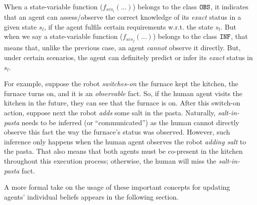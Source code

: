 \documentclass[letterpaper]{article} %
\begin{document}

When a state-variable function ($f_{svs_i}(...)$) belongs to the class $\texttt{OBS}$, it indicates that an agent can assess/observe the correct knowledge of its \textit{exact} status in a given state $s_l$, if the agent fulfils certain requirements w.r.t. the state $s_l$. 
But when we say a state-variable function ($f_{svs_j}(...)$) belongs to the class $\texttt{INF}$, that means that, unlike the previous case, an agent \textit{cannot} observe it directly. But, under certain scenarios, the agent can definitely predict or infer its \textit{exact} status in $s_l$.   

For example, suppose the robot \textit{switches-on} the furnace kept the kitchen, the furnace turns {\sc on}, and it is an \textit{observable} fact. So, if the human agent visits the kitchen in the future, they can see that the furnace is {\sc on}.     
After this switch-on action, suppose next the robot \textit{adds} some salt in the pasta. 
Naturally, \textit{salt-in-pasta} needs to be inferred (or ``communicated'') as the human cannot directly observe this fact the way the furnace's status was observed. 
However, such inference only happens when the human agent observes the robot \textit{adding salt} to the pasta. That also means that both agents must be co-present in the kitchen throughout this execution process; otherwise, the human will miss the \textit{salt-in-pasta} fact.  

A more formal take on the usage of these important concepts for updating agents' individual beliefs appears in the following section.   


\end{document}
